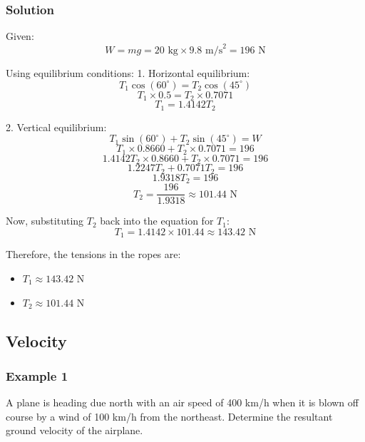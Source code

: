 \documentclass{article}
\begin{document}

\subsubsection*{Solution}

Given:
\[
W = mg = 20 \text{ kg} \times 9.8 \text{ m/s}^2 = 196 \text{ N}
\]

Using equilibrium conditions:
1. Horizontal equilibrium:
\[
T_1 \cos(60^\circ) = T_2 \cos(45^\circ)
\]
\[
T_1 \times 0.5 = T_2 \times 0.7071
\]
\[
T_1 = 1.4142 T_2
\]

2. Vertical equilibrium:
\[
T_1 \sin(60^\circ) + T_2 \sin(45^\circ) = W
\]
\[
T_1 \times 0.8660 + T_2 \times 0.7071 = 196
\]
\[
1.4142 T_2 \times 0.8660 + T_2 \times 0.7071 = 196
\]
\[
1.2247 T_2 + 0.7071 T_2 = 196
\]
\[
1.9318 T_2 = 196
\]
\[
T_2 = \frac{196}{1.9318} \approx 101.44 \text{ N}
\]

Now, substituting \( T_2 \) back into the equation for \( T_1 \):
\[
T_1 = 1.4142 \times 101.44 \approx 143.42 \text{ N}
\]

Therefore, the tensions in the ropes are:
\begin{itemize}
    \item \( T_1 \approx 143.42 \text{ N} \)
    \item \( T_2 \approx 101.44 \text{ N} \)
\end{itemize}
\subsection{Velocity}
\subsubsection*{Example 1}
A plane is heading due north with an air speed of 400 km/h when it is blown off course by a wind of 100 km/h from the northeast. Determine the resultant ground velocity of the airplane.
\end{document}
